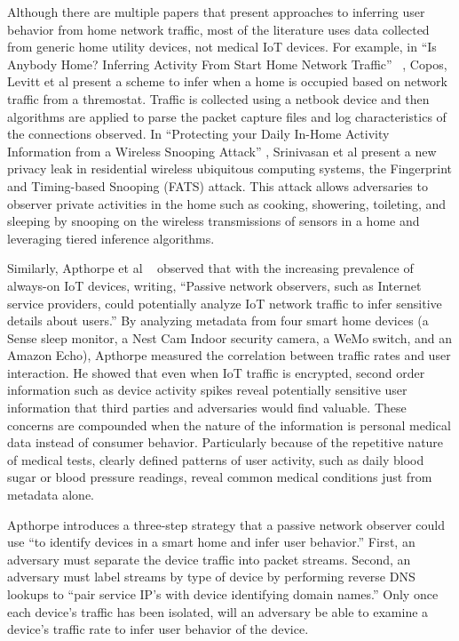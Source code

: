 Although there are multiple papers that present approaches to inferring user behavior from home network traffic, most of the literature uses data collected from generic home utility devices, not medical IoT devices. For example, in ``Is Anybody Home? Inferring Activity From Start Home Network Traffic'' ~\cite{coposIoT}, Copos, Levitt et al present a scheme to infer when a home is occupied based on network traffic from a thremostat. Traffic is collected using a netbook device and then algorithms are applied to parse the packet capture files and log characteristics of the connections observed. In ``Protecting your Daily In-Home Activity Information from a Wireless Snooping Attack'' \cite{srinivasan2008fats}, Srinivasan et al present a new privacy leak in residential wireless ubiquitous computing systems, the Fingerprint and Timing-based Snooping (FATS) attack. This attack allows adversaries to observer private activities in the home such as cooking, showering, toileting, and sleeping by snooping on the wireless transmissions of sensors in a home and leveraging tiered inference algorithms.

Similarly, Apthorpe et al ~\cite{apthorpeIoT} observed that with the increasing prevalence of always-on IoT devices, writing, ``Passive network observers, such as Internet service providers, could potentially analyze IoT network traffic to infer sensitive details about users.'' By analyzing metadata from four smart home devices (a Sense sleep monitor, a Nest Cam Indoor security camera, a WeMo switch, and an Amazon Echo), Apthorpe measured the correlation between traffic rates and user interaction. He showed that even when IoT traffic is encrypted, second order information such as device activity spikes reveal potentially sensitive user information that third parties and adversaries would find valuable. These concerns are compounded when the nature of the information is personal medical data instead of consumer behavior. Particularly because of the repetitive nature of medical tests, clearly defined patterns of user activity, such as daily blood sugar or blood pressure readings, reveal common medical conditions just from metadata alone. 

Apthorpe introduces a three-step strategy that a passive network observer could use ``to identify devices in a smart home and infer user behavior.'' First, an adversary must separate the device traffic into packet streams. Second, an adversary must label streams by type of device by performing reverse DNS lookups to ``pair service IP's with device identifying domain names.'' Only once each device's traffic has been isolated, will an adversary be able to examine a device's traffic rate to infer user behavior of the device. 

